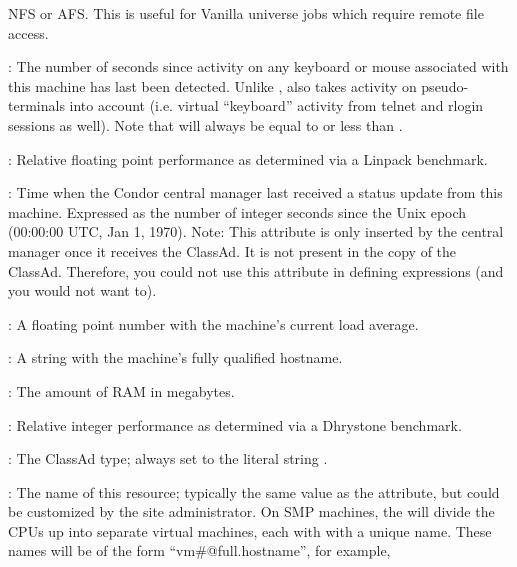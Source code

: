\begin{description}
NFS or AFS.  This is useful for Vanilla universe jobs which require
remote file access.
%
\item[\AdAttr{KeyboardIdle}] : The number of seconds since activity on any
keyboard or mouse associated with this machine has last been detected.
Unlike ,  also takes activity 
on pseudo-terminals into
account (i.e. virtual ``keyboard'' activity from telnet and rlogin
sessions as well).  Note that  will always be equal to or
less than .
%
\item[\AdAttr{KFlops}] : Relative floating point performance as determined via a
Linpack benchmark.
%
\item[\AdAttr{LastHeardFrom}] : Time when the Condor central manager last
received a status update from this machine.  
Expressed as 
the number of integer seconds since the Unix epoch (00:00:00 UTC, Jan 1, 1970).
Note: This attribute is only inserted by the central manager once it
receives the ClassAd.
It is not present in the  copy of the ClassAd.
Therefore, you could not use this attribute in defining 
expressions (and you would not want to).
%
\item[\AdAttr{LoadAvg}] : A floating point number with the machine's current load
average.
%
\item[\AdAttr{Machine}] : A string with the machine's fully qualified hostname.
%
\item[\AdAttr{Memory}] : The amount of RAM in megabytes.
%
\item[\AdAttr{Mips}] : Relative integer performance as determined via a Dhrystone
benchmark.
%
\item[\AdAttr{MyType}] : The ClassAd type; always set to the literal string .
%
\item[\AdAttr{Name}] : The name of this resource; typically the same value as
the  attribute, but could be customized by the site
administrator.
On SMP machines, the  will divide the CPUs up into separate
virtual machines, each with with a unique name.
These names will be of the form ``vm\#@full.hostname'', for example,

\end{description}
